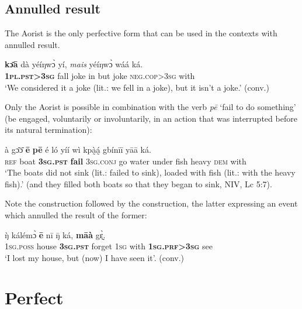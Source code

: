 \documentclass[output=paper]{LSP/langsci}
\begin{document}
\subsection{Annulled result}
\label{khachsectanres}
The Aorist is the only perfective form that can be used in the contexts with annulled result.

\begin{exe} \ex
\gll \textbf{kɔ̄ā}	dà	yéíŋwɔ̀	yí,	\textit{mais}	yéíŋwɔ̀	wáá	ká.	\\
\textbf{1\textsc{pl}.\textsc{pst}>3\textsc{sg}}	fall	joke	in	but	joke	\textsc{neg.cop}>3\textsc{sg}	with	 \\
\glt ‘We considered it a joke (lit.: we fell in a joke), but it isn’t a joke.’ (conv.)
\end{exe}

Only the Aorist is possible in combination with the verb \textit{pē} ‘fail to do something’ (be engaged, voluntarily or involuntarily, in an action that was interrupted before its natural termination):

\begin{exe} \ex
\gll	à	gɔ̄ɔ̄	\textbf{ē}	\textbf{pē}	é	ló	yíí	wì	kpà̰á̰	gbínīī	yāā	ká.\\
	\textsc{ref}	boat	\textbf{3\textsc{sg}.\textsc{pst}}	\textbf{fail}	3\textsc{sg}.\textsc{conj}	go	water	under	fish	heavy	\textsc{dem}	with\\
\glt ‘The boats did not sink (lit.: failed to sink), loaded with fish (lit.: with the heavy fish).' (and they filled both boats so that they began to sink, NIV, Lc 5:7). 
\end{exe}

Note the  construction followed by the  construction, the latter expressing an event which annulled the result of the former:

\begin{exe} \ex
\gll ŋ̀	kálémɔ̀	\textbf{ē}	nī	ŋ̄	ká,	\textbf{māà}	gɛ̰̀. \\
	1\textsc{sg}.\textsc{poss}	house	\textbf{3\textsc{sg}.\textsc{pst}}	forget	1\textsc{sg}	with	\textbf{1\textsc{sg}.\textsc{prf}>3\textsc{sg}}	see\\
\glt `I lost my house, but (now) I have seen it'. (conv.)
\end{exe}

\section{Perfect}
\label{khachsprf}
\end{document}
